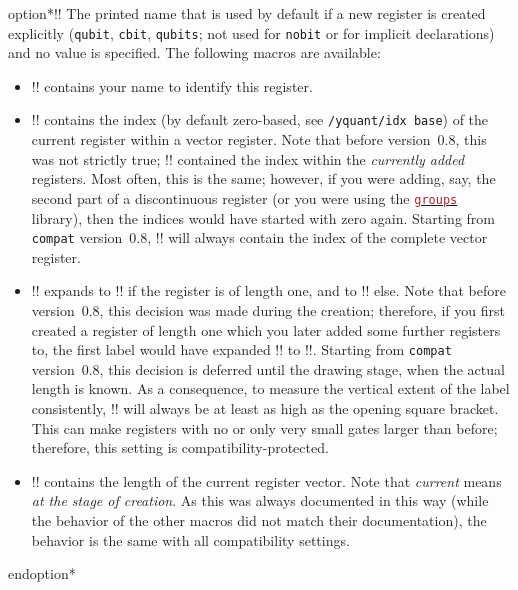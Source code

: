 \documentclass{scrartcl}
\newenvironment{option}[1][]{\csname option*\endcsname[{#1}]{yquant}}{\csname endoption*\endcsname}
\def\pkg#1{\textcolor{brown}{\texttt{#1}}}
\def\langlink#1{\hyperref[sec:foreign:#1]{\pkg{#1}}}
\def\ttlink{\link\texttt}
\begin{document}
         \begin{option}{register/default name}!\regidx!
            The printed name that is used by default if a new register is created explicitly (\ttlink{qubit}, \ttlink{cbit}, \ttlink{qubits}; not used for \ttlink{nobit} or for implicit declarations) and no value is specified.
            The following macros are available:
            \begin{itemize}
               \item \linkdef\reg\tex!\reg! contains your name to identify this register.
               \item \linkdef\idx\tex!\idx! contains the index (by default zero\hyp based, see \ttlink{/yquant/idx base}) of the current register within a vector register.
                  Note that before version~0.8, this was not strictly true; \tex!\idx! contained the index within the \emph{currently added} registers.
                  Most often, this is the same; however, if you were adding, say, the second part of a discontinuous register (or you were using the \langlink{groups} library), then the indices would have started with zero again.
                  Starting from \ttlink{compat} version~0.8, \tex!\idx! will always contain the index of the complete vector register.
               \item \linkdef\regidx\tex!\regidx! expands to \tex!\reg! if the register is of length one, and to \tex!\reg[\idx]! else.
                  Note that before version~0.8, this decision was made during the creation; therefore, if you first created a register of length one which you later added some further registers to, the first label would have expanded \tex!\regidx! to \tex!\reg!.
                  Starting from \ttlink{compat} version~0.8, this decision is deferred until the drawing stage, when the actual length is known.
                  As a consequence, to measure the vertical extent of the label consistently, \tex!\regidx! will always be at least as high as the opening square bracket.
                  This can make registers with no or only very small gates larger than before; therefore, this setting is compatibility\hyp protected.
               \item \linkdef\len\tex!\len! contains the length of the current register vector.
                  Note that \emph{current} means \emph{at the stage of creation}.
                  As this was always documented in this way (while the behavior of the other macros did not match their documentation), the behavior is the same with all compatibility settings.
            \end{itemize}
         \end{option}
\end{document}
